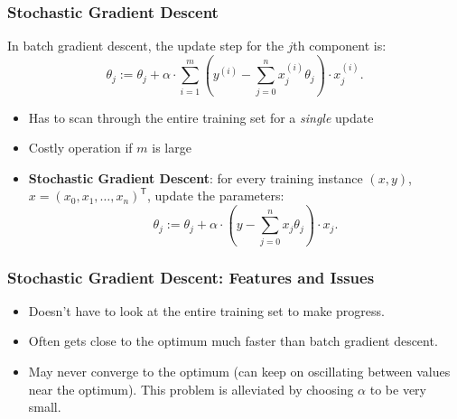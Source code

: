 \documentclass[xcolor=table]{beamer}
\newcommand{\trans}[1]{\ensuremath{#1}^{\scriptscriptstyle{\textsf{T}}}}
\begin{document}
\begin{frame}[t]
\frametitle{Stochastic Gradient Descent}
In batch gradient descent, the update step for the $j$th component is:
\[
    \theta_j := \theta_j  + \alpha \cdot \sum_{i = 1}^m 
        \left ( y^{(i)} - \sum_{j = 0}^n x_j^{(i)} \theta_j \right ) \cdot x_j^{(i)}.
\]

\begin{itemize}
    \item Has to scan through the entire training set for a \emph{single} update
    
    \item Costly operation if $m$ is large
    
    \pause

    \item \textbf{Stochastic Gradient Descent}: for every training instance $(x, y)$, 
    $x = \trans{(x_0, x_1, \ldots, x_n)}$, update the parameters:
    \[
         \theta_j := \theta_j  + \alpha \cdot \left ( y - \sum_{j = 0}^n x_j 
         \theta_j \right ) \cdot x_j.
    \]
\end{itemize}
\end{frame}

\begin{frame}[t]
\frametitle{Stochastic Gradient Descent: Features and Issues}
\begin{itemize}
    \item Doesn't have to look at the entire training set to make progress.

    \item Often gets close to the optimum much faster than batch gradient descent.

    \item May never converge to the optimum (can keep on oscillating between values 
    near the optimum). This problem is alleviated by choosing $\alpha$ to be very
    small.
\end{itemize}
\end{frame}
\end{document}
